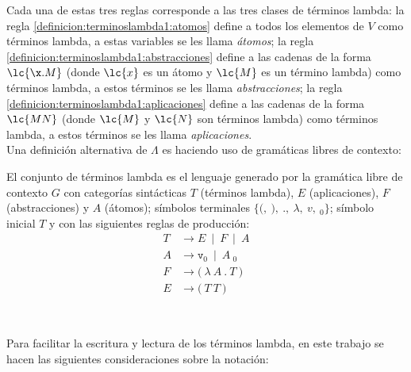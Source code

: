 Cada una de estas tres reglas corresponde a las tres clases de términos lambda:
la regla \eqref{definicion:terminoslambda1:atomos} define a todos los elementos
de \(V\) como términos lambda, a estas variables se les llama \emph{átomos}; la
regla \eqref{definicion:terminoslambda1:abstracciones} define a las cadenas de
la forma \(\lc{\x.M}\) (donde \(\lc{x}\) es un átomo y \(\lc{M}\) es un término
lambda) como términos lambda, a estos términos se les llama
\emph{abstracciones}; la regla \eqref{definicion:terminoslambda1:aplicaciones}
define a las cadenas de la forma \(\lc{M N}\) (donde \(\lc{M}\) y \(\lc{N}\) son
términos lambda) como términos lambda, a estos términos se les llama
\emph{aplicaciones}. \\

Una definición alternativa de \(\Lambda\) es haciendo uso de gramáticas libres
de contexto: \\

\begin{defi} El conjunto de términos lambda es el lenguaje
  generado por la gramática libre de contexto \(G\) con categorías sintácticas
  \(T\) (términos lambda), \(E\) (aplicaciones), \(F\) (abstracciones) y \(A\)
  (átomos); símbolos terminales \(\{\texttt{(},\ \texttt{)},\ \texttt{.},\
  \lambda,\ v,\ {}_{0}\}\); símbolo inicial \(T\) y con las siguientes
  reglas de producción: \
  \label{definicion:terminoslambda2}
  \begin{subequations}
    \label{definicion:terminoslambda2:producciones}
    \begin{align}
      \label{definicion:terminoslambda2:terminos} \tag{a}
      T &\rightarrow E\ \mid\ F\ \mid\ A
      \\
      \label{definicion:terminoslambda2:atomos} \tag{b}
      A &\rightarrow \texttt{v}_{0}\ \mid\ A\ {}_{0}
      \\
      \label{definicion:terminoslambda2:abstracciones} \tag{c}
      F &\rightarrow \texttt{(}\ \lambda\ A\ \texttt{.}\ T\ \texttt{)}
      \\
      \label{definicion:terminoslambda2:aplicaciones} \tag{d}
      E &\rightarrow \texttt{(}\ T\ T\ \texttt{)}
    \end{align}
  \end{subequations}
\end{defi} \

Para facilitar la escritura y lectura de los términos lambda, en este trabajo se
hacen las siguientes consideraciones sobre la notación: \\

